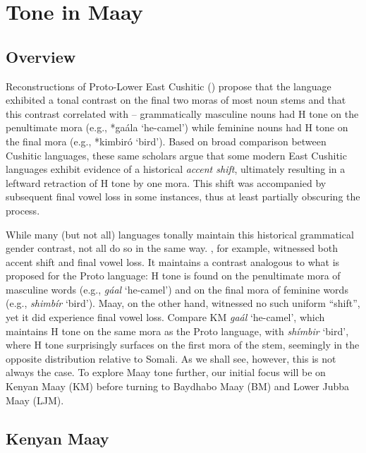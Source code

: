 \documentclass[output=paper,colorlinks,citecolor=brown]{langscibook}
\begin{document}
\section{Tone in Maay}

\subsection{Overview}

Reconstructions of Proto-Lower East Cushitic (\citealt{Appleyard1991,Lamberti1986}) propose that the language exhibited a tonal contrast on the final two moras of most noun stems and that this contrast correlated with  -- grammatically masculine nouns had H tone on the penultimate mora (e.g., *gaála `he-camel') while feminine nouns had H tone on the final mora (e.g., *kimbiró `bird'). Based on broad comparison between Cushitic languages, these same scholars argue that some modern East Cushitic languages exhibit evidence of a  historical \textit{accent shift}, ultimately resulting in a leftward retraction of H tone by one mora. This shift was accompanied by subsequent final vowel loss in some instances, thus at least partially obscuring the process. 

While many (but not all) languages tonally maintain this historical grammatical gender contrast, not all do so in the same way. , for example, witnessed both accent shift and final vowel loss. It maintains a contrast analogous to what is proposed for the Proto language: H tone is found on the penultimate mora of masculine words (e.g., \textit{gáal} `he-camel') and on the final mora of feminine words (e.g., \textit{shimbír} `bird'). Maay, on the other hand, witnessed no such uniform ``shift'', yet it did experience final vowel loss. Compare KM \textit{gaál} `he-camel', which maintains H tone on the same mora as the Proto language, with \textit{shímbir} `bird', where H tone surprisingly surfaces on the first mora of the stem, seemingly in the opposite distribution relative to Somali. As we shall see, however, this is not always the case. To explore Maay tone further, our initial focus will be on Kenyan Maay (KM) before turning to Baydhabo Maay (BM) and Lower Jubba Maay (LJM). 

\subsection{Kenyan Maay}
\end{document}
